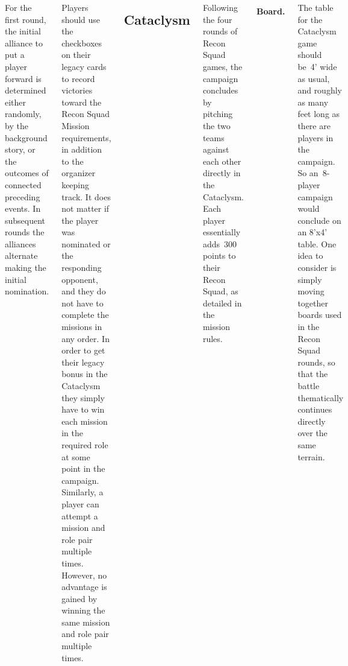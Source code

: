 \begin{columns}
For the first round, the initial alliance to put a player forward is
determined either randomly, by the background story, or the outcomes
of connected preceding events.  In subsequent rounds the alliances
alternate making the initial nomination.




Players should use the checkboxes on their legacy cards to record
victories toward the Recon Squad Mission requirements, in addition to
the organizer keeping track.  It does not matter if the player was
nominated or the responding opponent, and they do not have to complete
the missions in any order.  In order to get their legacy bonus in the
Cataclysm they simply have to win each mission in the required role at
some point in the campaign.  Similarly, a player can attempt a mission
and role pair multiple times.  However, no advantage is gained by
winning the same mission and role pair multiple times.

\subsection{Cataclysm}

Following the four rounds of Recon Squad games, the campaign concludes
by pitching the two teams against each other directly in the
Cataclysm.  Each player essentially adds~300 points to their Recon
Squad, as detailed in the mission rules.


\paragraph{Board.}  The table for the Cataclysm game should be~4'
wide as usual, and roughly as many feet long as there are players in
the campaign.  So an~8-player campaign would conclude on an 8'x4'
table.  One idea to consider is simply moving together boards used in
the Recon Squad rounds, so that the battle thematically continues
directly over the same terrain.


\end{columns}
